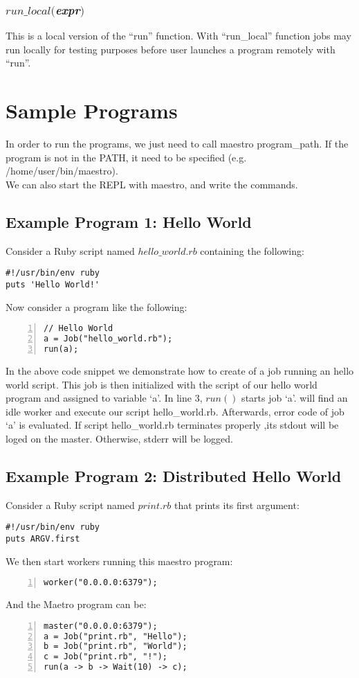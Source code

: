 \subsubsection*{$run\_local($\textit{expr}$)$}
This is a local version of the ``run'' function.
With ``run\_local'' function jobs may run locally for testing purposes before
user launches a program remotely with ``run''.


\section{Sample Programs}
\label{sect:samples}
In order to run the programs, we just need to call maestro program\_path. If the \lang{} 
program is not in the PATH, it need to be specified (e.g. /home/user/bin/maestro).\\
We can also start the REPL with maestro, and write the commands.

\subsection*{Example Program 1: Hello World}
Consider a Ruby script named $hello\_world.rb$ containing the following:
\begin{verbatim}
#!/usr/bin/env ruby
puts 'Hello World!'
\end{verbatim}
Now consider a \lang{} program like the following:
\begin{Verbatim}[numbers=left]
// Hello World
a = Job("hello_world.rb");
run(a);
\end{Verbatim}

In the above code snippet we demonstrate how to create of a job running an hello world script.
This job is then initialized with the script of our hello world program and
assigned to variable `a'. In line 3, $run()$ starts job `a'. 
\lang{} will find an idle worker and execute our script hello\_world.rb.
Afterwards, error code of job `a' is evaluated. If script hello\_world.rb terminates properly
,its stdout will be loged on the master. Otherwise, stderr will be logged.

\subsection*{Example Program 2: Distributed Hello World}
Consider a Ruby script named $print.rb$ that prints its first argument:
\begin{verbatim}
#!/usr/bin/env ruby
puts ARGV.first
\end{verbatim}
We then start workers running this maestro program:
\begin{Verbatim}[numbers=left]
worker("0.0.0.0:6379");
\end{Verbatim}
And the Maetro program can be:
\begin{Verbatim}[numbers=left]
master("0.0.0.0:6379");
a = Job("print.rb", "Hello");
b = Job("print.rb", "World");
c = Job("print.rb", "!");
run(a -> b -> Wait(10) -> c);
\end{Verbatim}

